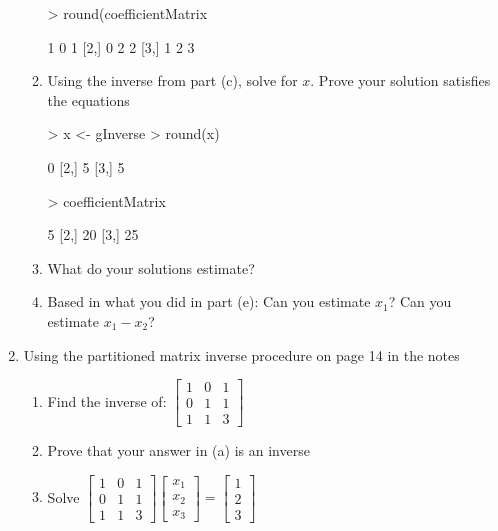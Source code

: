 \documentclass[12pt,a4paper]{paper}
\begin{document}
\begin{enumerate}
\begin{enumerate}
\begin{Schunk}
\begin{Sinput}
> round(coefficientMatrix %*% gInverse %*% coefficientMatrix)
\end{Sinput}
\begin{Soutput}
     [,1] [,2] [,3]
[1,]    1    0    1
[2,]    0    2    2
[3,]    1    2    3
\end{Soutput}
\end{Schunk}
\item Using the inverse from part (c), solve for $x$. Prove your solution satisfies the equations
\begin{Schunk}
\begin{Sinput}
> x <- gInverse %*% c(5, 20, 25)
> round(x)
\end{Sinput}
\begin{Soutput}
     [,1]
[1,]    0
[2,]    5
[3,]    5
\end{Soutput}
\begin{Sinput}
> coefficientMatrix %*% x
\end{Sinput}
\begin{Soutput}
     [,1]
[1,]    5
[2,]   20
[3,]   25
\end{Soutput}
\end{Schunk}
\item What do your solutions estimate?
\item Based in what you did in part (e): Can you estimate $x_{1}$? Can you estimate $x_{1} - x_{2}$?
\end{enumerate}
\item Using the partitioned matrix inverse procedure on page 14 in the notes
\begin{enumerate}
\item Find the inverse of: $\left[\begin{array}{ccc}1&0&1\\0&1&1\\1&1&3\end{array}\right]$
\item Prove that your answer in (a) is an inverse
\item Solve $\left[\begin{array}{ccc}1&0&1\\0&1&1\\1&1&3\end{array}\right]\left[\begin{array}{c}x_1\\x_2\\x_3\end{array}\right]=\left[\begin{array}{c}1\\2\\3\end{array}\right]$

\end{enumerate}
\end{enumerate}
\end{document}
